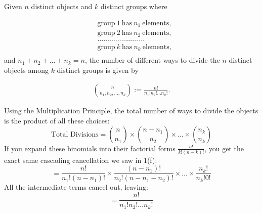 \documentclass[12pt]{article}
\begin{document}
\begin{enumerate}
{\begin{tcolorbox}
    Given $n$ distinct objects and $k$ distinct groups where

    \begin{align*}
       &  \text{group} ~ 1 ~ \text{has} ~ n_1 ~ \text{elements,} \\
       &  \text{group}  ~ 2 ~ \text{has} ~ n_2 ~ \text{elements,} \\
       & \ldots   \ldots   \ldots  \ldots   \ldots  \ldots  \ldots  \ldots \\
        &  \text{group} ~  k ~ \text{has} ~ n_k ~ \text{elements,} \\
    \end{align*}
and $n_1 + n_2 + \ldots + n_k = n$, the number of different ways to divide the $n$ distinct objects among $k$ distinct groups is given by

\begin{align*}
    \binom{n}{n_1, n_2, \ldots, n_k} :=   \frac{n!}{n_1! n_2! \ldots n_k!}.
\end{align*}
\end{tcolorbox}}
Using the Multiplication Principle, the total number of ways to divide the objects is the product of all these choices:$$\text{Total Divisions} = \binom{n}{n_1} \times \binom{n - n_1}{n_2} \times \dots \times \binom{n_k}{n_k}$$If you expand these binomials into their factorial forms $\frac{n!}{k!(n-k)!}$, you get the exact same cascading cancellation we saw in 1(f):$$= \frac{n!}{n_1!(n-n_1)!} \times \frac{(n-n_1)!}{n_2!(n-n_1-n_2)!} \times \dots \times \frac{n_k!}{n_k!0!}$$All the intermediate terms cancel out, leaving:$$= \frac{n!}{n_1! n_2! \dots n_k!}$$
\end{enumerate}
\newpage


\end{document}
